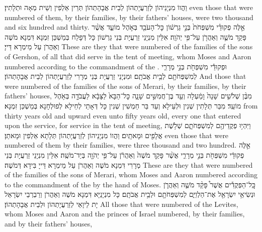 {וַהֲווֹ מִנְיָנֵיהוֹן לְזַרְעֲיָתְהוֹן לְבֵית אֲבָהָתְהוֹן תְּרֵין אַלְפִין וְשֵׁית מְאָה וּתְלָתִין׃}
{even those that were numbered of them, by their families, by their fathers’ houses, were two thousand and six hundred and thirty.}{}
{אֵ֣לֶּה פְקוּדֵ֗י מִשְׁפְּחֹת֙ בְּנֵ֣י גֵרְשׁ֔וֹן כׇּל־הָעֹבֵ֖ד בְּאֹ֣הֶל מוֹעֵ֑ד אֲשֶׁ֨ר פָּקַ֥ד מֹשֶׁ֛ה וְאַהֲרֹ֖ן עַל־פִּ֥י יְהֹוָֽה׃}
{אִלֵּין מִנְיָנֵי זַרְעֲיָת בְּנֵי גֵרְשׁוֹן כָּל דְּפָלַח בְּמַשְׁכַּן זִמְנָא דִּמְנָא מֹשֶׁה וְאַהֲרֹן עַל מֵימְרָא דַּייָ׃}
{These are they that were numbered of the families of the sons of Gershon, of all that did serve in the tent of meeting, whom Moses and Aaron numbered according to the commandment of the \lord.}{}
{וּפְקוּדֵ֕י מִשְׁפְּחֹ֖ת בְּנֵ֣י מְרָרִ֑י לְמִשְׁפְּחֹתָ֖ם לְבֵ֥ית אֲבֹתָֽם׃}
{וּמִנְיָנֵי זַרְעֲיָת בְּנֵי מְרָרִי לְזַרְעֲיָתְהוֹן לְבֵית אֲבָהָתְהוֹן׃}
{And those that were numbered of the families of the sons of Merari, by their families, by their fathers’ houses,}{}
{מִבֶּ֨ן שְׁלֹשִׁ֤ים שָׁנָה֙ וָמַ֔עְלָה וְעַ֖ד בֶּן־חֲמִשִּׁ֣ים שָׁנָ֑ה כׇּל־הַבָּא֙ לַצָּבָ֔א לַעֲבֹדָ֖ה בְּאֹ֥הֶל מוֹעֵֽד׃}
{מִבַּר תְּלָתִין שְׁנִין וּלְעֵילָא וְעַד בַּר חַמְשִׁין שְׁנִין כָּל דְּאָתֵי לְחֵילָא לְפוּלְחָנָא בְּמַשְׁכַּן זִמְנָא׃}
{from thirty years old and upward even unto fifty years old, every one that entered upon the service, for service in the tent of meeting,}{}
{וַיִּהְי֥וּ פְקֻדֵיהֶ֖ם לְמִשְׁפְּחֹתָ֑ם שְׁלֹ֥שֶׁת אֲלָפִ֖ים וּמָאתָֽיִם׃}
{וַהֲווֹ מִנְיָנֵיהוֹן לְזַרְעֲיָתְהוֹן תְּלָתָא אַלְפִין וּמָאתַן׃}
{even those that were numbered of them by their families, were three thousand and two hundred.}{}
{אֵ֣לֶּה פְקוּדֵ֔י מִשְׁפְּחֹ֖ת בְּנֵ֣י מְרָרִ֑י אֲשֶׁ֨ר פָּקַ֤ד מֹשֶׁה֙ וְאַהֲרֹ֔ן עַל־פִּ֥י יְהֹוָ֖ה בְּיַד־מֹשֶֽׁה׃}
{אִלֵּין מִנְיָנֵי זַרְעֲיָת בְּנֵי מְרָרִי דִּמְנָא מֹשֶׁה וְאַהֲרֹן עַל מֵימְרָא דַּייָ בִּידָא דְּמֹשֶׁה׃}
{These are they that were numbered of the families of the sons of Merari, whom Moses and Aaron numbered according to the commandment of the \lord\space by the hand of Moses.}{}
{כׇּֽל־הַפְּקֻדִ֡ים אֲשֶׁר֩ פָּקַ֨ד מֹשֶׁ֧ה וְאַהֲרֹ֛ן וּנְשִׂיאֵ֥י יִשְׂרָאֵ֖ל אֶת־הַלְוִיִּ֑ם לְמִשְׁפְּחֹתָ֖ם וּלְבֵ֥ית אֲבֹתָֽם׃}
{כָּל מִנְיָנַיָּא דִּמְנָא מֹשֶׁה וְאַהֲרֹן וְרַבְרְבֵי יִשְׂרָאֵל יָת לֵיוָאֵי לְזַרְעֲיָתְהוֹן וּלְבֵית אֲבָהָתְהוֹן׃}
{All those that were numbered of the Levites, whom Moses and Aaron and the princes of Israel numbered, by their families, and by their fathers’ houses,}{}
